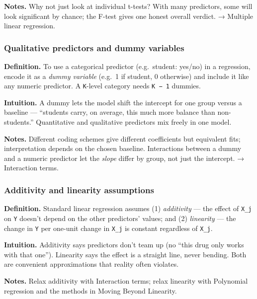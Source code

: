 \documentclass[
  10pt,
  letterpaper,
  onecolumn]{article}
\begin{document}
\textbf{Notes.} Why not just look at individual t-tests? With many
predictors, some will look significant by chance; the F-test gives one
honest overall verdict. → Multiple linear regression.

\hypertarget{qualitative-predictors-and-dummy-variables}{%
\subsubsection{Qualitative predictors and dummy
variables}\label{qualitative-predictors-and-dummy-variables}}

\textbf{Definition.} To use a categorical predictor (e.g.~student:
yes/no) in a regression, encode it as a \emph{dummy variable} (e.g.~1 if
student, 0 otherwise) and include it like any numeric predictor. A
\texttt{K}-level category needs \texttt{K\ −\ 1} dummies.

\textbf{Intuition.} A dummy lets the model shift the intercept for one
group versus a baseline --- ``students carry, on average, this much more
balance than non-students.'' Quantitative and qualitative predictors mix
freely in one model.

\textbf{Notes.} Different coding schemes give different coefficients but
equivalent fits; interpretation depends on the chosen baseline.
Interactions between a dummy and a numeric predictor let the
\emph{slope} differ by group, not just the intercept. → Interaction
terms.

\hypertarget{additivity-and-linearity-assumptions}{%
\subsubsection{Additivity and linearity
assumptions}\label{additivity-and-linearity-assumptions}}

\textbf{Definition.} Standard linear regression assumes (1)
\emph{additivity} --- the effect of \texttt{X\_j} on \texttt{Y} doesn't
depend on the other predictors' values; and (2) \emph{linearity} --- the
change in \texttt{Y} per one-unit change in \texttt{X\_j} is constant
regardless of \texttt{X\_j}.

\textbf{Intuition.} Additivity says predictors don't team up (no ``this
drug only works with that one''). Linearity says the effect is a
straight line, never bending. Both are convenient approximations that
reality often violates.

\textbf{Notes.} Relax additivity with Interaction terms; relax linearity
with Polynomial regression and the methods in Moving Beyond Linearity.
\end{document}
